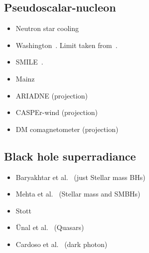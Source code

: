 \documentclass[10pt,twocolumn]{extarticle}
\begin{document}
\begin{mdframed}
\subsection*{Pseudoscalar-nucleon}\vspace{-0.5em}
\begin{itemize}\setlength\itemsep{-0.5em}
	\item Neutron star cooling~\cite{Beznogov:2018fda}
    \item Washington~\cite{Venema:1992zz}. Limit taken from~\cite{Safronova:2017xyt}.
    \item SMILE~\cite{Lee:2018vaq}.
    \item Mainz~\cite{Tullney:2013wqa}
    \item ARIADNE (projection)~\cite{Arvanitaki:2014dfa}
    \item CASPEr-wind (projection)~\cite{JacksonKimball:2017elr}
    \item DM comagnetometer (projection)~\cite{Bloch:2019lcy}
\end{itemize}
\end{mdframed}

\begin{mdframed}
\vspace{-1em}
\section{Black hole superradiance}\vspace{-0.5em}
\begin{itemize}\setlength\itemsep{-0.5em}
	\item Baryakhtar et al.~\cite{Baryakhtar:2020gao} (just Stellar mass BHs)
	\item Mehta et al.~\cite{Baryakhtar:2020gao} (Stellar mass and SMBHs)
	\item Stott~\cite{Stott:2020gjj}
	\item \"Unal et al.~\cite{Unal:2020jiy} (Quasars)
	\item Cardoso et al.~\cite{Cardoso:2018tly} (dark photon)
\end{itemize}
\end{mdframed}

\newpage 
\end{document}
